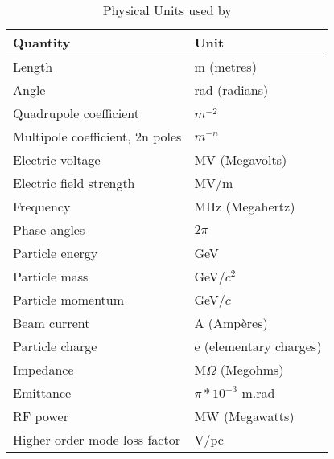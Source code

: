 \begin{table}[ht]
  \caption{Physical Units used by \madx}
  \vspace{1ex}
  \begin{center}
   \begin{tabular}{|l|l|}
      \hline
      {\bf Quantity}          & {\bf Unit} \\
      \hline
      Length                  & m (metres) \\ 
      Angle                   & rad (radians) \\ 
      Quadrupole coefficient  & $m^{-2}$ \\ 
      Multipole coefficient, 2n poles   & $m^{-n}$ \\ 
      Electric voltage        & MV (Megavolts) \\ 
      Electric field strength & MV/m \\ 
      Frequency               & MHz (Megahertz) \\ 
      Phase angles            & $2\pi$ \\ 
      Particle energy         & GeV \\ 
      Particle mass           & GeV/$c^2$ \\ 
      Particle momentum       & GeV/$c$ \\ 
      Beam current            & A (Amp\`eres) \\ 
      Particle charge         & e (elementary charges) \\ 
      Impedance               & M$\Omega$ (Megohms) \\ 
      Emittance               & $\pi * 10^{-3}$ m.rad \\ %
      RF power                & MW (Megawatts) \\ 
      Higher order mode loss factor & V/pc \\
      \hline
    \end{tabular}
  \end{center}
\end{table}

